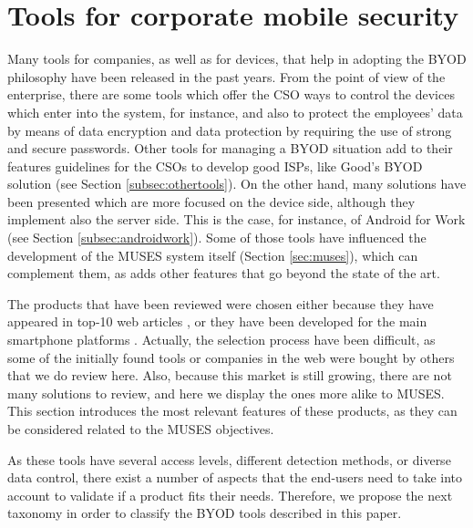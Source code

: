 \section{Tools for corporate mobile security}
\label{sec:toolsreview}

Many tools for companies, as well as for devices, that help in adopting the BYOD philosophy have been released in the past years. From the point of view of the enterprise, there are some tools which offer the CSO ways to control the devices which enter into the system, for instance, and also to protect the employees' data by means of data encryption and data protection by requiring the use of strong and secure passwords. Other tools for managing a BYOD situation add to their features guidelines for the CSOs to develop good ISPs, like Good's BYOD solution (see Section \ref{subsec:othertools}). On the other hand, many solutions have been presented which are more focused on the device side, although they implement also the server side. This is the case, for instance, of Android for Work (see Section \ref{subsec:androidwork}). Some of those tools have influenced the development of the MUSES system  itself (Section \ref{sec:muses}), which can complement them, as adds other features that go beyond the state of the art. 

The products that have been reviewed were chosen either because they have appeared in top-10 web articles \cite{thor2013}, or they have been developed for the main smartphone platforms \cite{idc2014}. Actually, the selection process have been difficult, as some of the initially found tools or companies in the web were bought by others that we do review here. Also, because this market is still growing, there are not many solutions to review, and here we display the ones more alike to MUSES. This section introduces the most relevant features of these products, as they can be considered related to the MUSES objectives.

As these tools have several access levels, different detection methods, or diverse data control, there exist a number of aspects that the end-users need to take into account to validate if a product fits their needs. Therefore, we propose the next taxonomy in order to classify the BYOD tools described in this paper.

